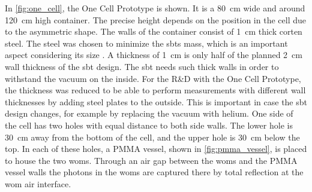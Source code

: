 In \autoref{fig:one_cell}, the One Cell Prototype is shown.
It is a \SI{80}{\centi\meter} wide and around \SI{120}{\centi\meter} high container.
The precise height depends on the position in the cell due to the asymmetric shape.
The walls of the container consist of \SI{1}{\centi\meter} thick corten steel.
The steel was chosen to minimize the \ac{sbt}s mass, which is an important aspect considering its size \cite{strucural_design}.
A thickness of \SI{1}{\centi\meter} is only half of the planned \SI{2}{\centi\meter} wall thickness of the \ac{sbt} design.
The \ac{sbt} needs such thick walls in order to withstand the vacuum on the inside.
For the R\&D with the One Cell Prototype, the thickness was reduced to be able to perform measurements with different wall thicknesses by adding steel plates to the outside.
This is important in case the \ac{sbt} design changes, for example by replacing the vacuum with helium.
One side of the cell has two holes with equal distance to both side walls.
The lower hole is \SI{30}{\centi\meter} away from the bottom of the cell, and the upper hole is \SI{30}{\centi\meter} below the top.
In each of these holes, a PMMA vessel, shown in \autoref{fig:pmma_vessel}, is placed to house the two \acp{wom}.
Through an air gap between the \acp{wom} and the PMMA vessel walls the photons in the \acp{wom} are captured there by total reflection at the \ac{wom} air interface.

